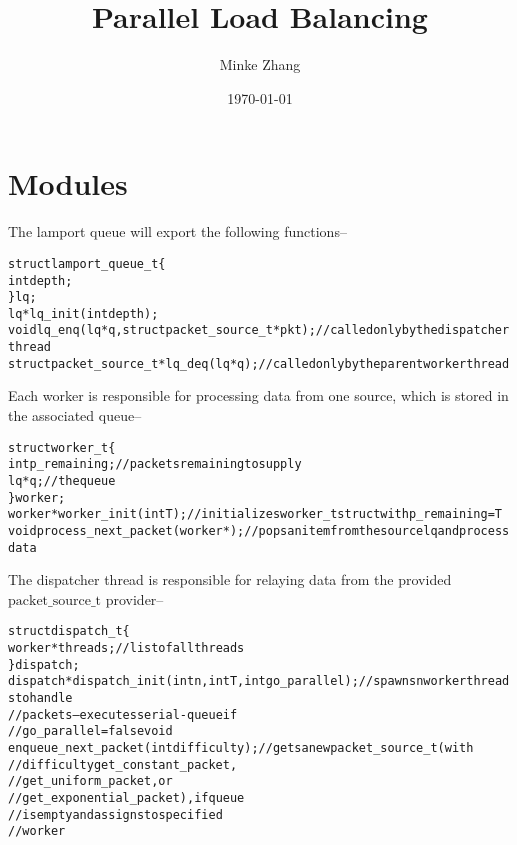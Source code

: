 \documentclass{article}
\newcommand{\tb}[1]{\textbf{#1}}
\newcommand{\cpart}[1]{\newblock{\LARGE {\\\\#1}}}
\newcommand{\code}[1]{\texttt{$\text{#1}$}}
\begin{document}

\title{\tb{Parallel Load Balancing}}
\author{Minke Zhang\hspace*{-\tabcolsep}}
\date{\today}

\begingroup
\let\center\flushright
\let\endcenter\endflushright
\maketitle
\endgroup

\section{Modules}

\cpart{Lamport Queue}

The lamport queue will export the following functions--

\begin{alltt}
struct lamport_queue_t \{
  int depth;
\} lq;
lq *lq_init(int depth);
void lq_enq(lq *q, struct packet_source_t *pkt);   // called only by the dispatcher thread
struct packet_source_t *lq_deq(lq *q);             // called only by the parent worker thread
\end{alltt}

\cpart{Workers}

Each worker is responsible for processing data from one source, which is stored in the associated queue--
\begin{alltt}
struct worker_t \{
  int p_remaining;                      // packets remaining to supply
  lq *q;                                // the queue
\} worker;
worker *worker_init(int T);             // initializes worker\_t struct with p\_remaining = T
void process_next_packet(worker *);     // pops an item from the source lq and process data
\end{alltt}

\cpart{Dispatcher}

The dispatcher thread is responsible for relaying data from the provided \code{packet\_source\_t} provider--

\begin{alltt}
struct dispatch_t \{
  worker *threads;                                      // list of all threads
\} dispatch;
dispatch *dispatch_init(int n, int T, int go_parallel); // spawns n worker threads to handle
                                                        //   packets-- executes serial-queue if
                                                        //   go_parallel = false void
enqueue_next_packet(int difficulty);                    // gets a new packet_source_t (with
                                                        //   difficulty get_constant_packet,
                                                        //   get_uniform_packet, or
                                                        //   get_exponential_packet), if queue
                                                        //   is empty and assigns to specified
                                                        //   worker
\end{alltt}
\end{document}
